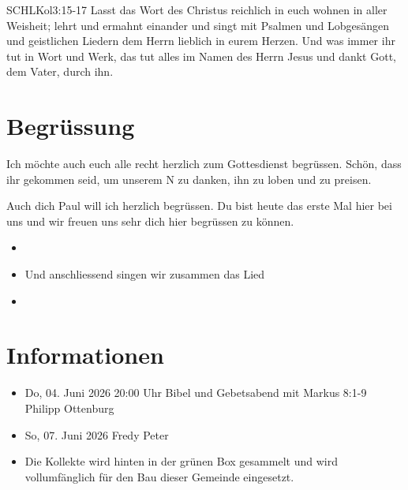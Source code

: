 \documentclass[fontsize=14pt]{../../inc/mybib}
\newcommand{\Name}{Paul}
\begin{document}
\begin{bibelbox}{SCHL}{Kol}{3:15-17}
    Lasst das Wort des Christus reichlich in euch wohnen in aller Weisheit; lehrt und ermahnt einander und singt mit Psalmen und Lobgesängen und geistlichen Liedern dem Herrn lieblich in eurem Herzen. Und was immer ihr tut in Wort und Werk, das tut alles im Namen des Herrn Jesus und dankt Gott, dem Vater, durch ihn.
\end{bibelbox}
\section{Begrüssung}
Ich möchte auch euch alle recht herzlich zum Gottesdienst begrüssen. Schön, dass ihr gekommen seid, um unserem \herr N zu danken, ihn zu loben und zu preisen.

Auch dich \Name{} will ich herzlich begrüssen. Du bist heute das erste Mal hier bei uns und wir freuen uns sehr dich hier begrüssen zu können.
\begin{itemize}
    \item[] 
    \item[] Und anschliessend singen wir zusammen das Lied
    \item[] 
\end{itemize}

\section{Informationen}
\begin{itemize}
    \item {} Do, 04. Juni 2026 20:00 Uhr Bibel und Gebetsabend mit Markus 8:1-9 Philipp Ottenburg
    \item {} So, 07. Juni 2026 Fredy Peter
    \item {} Die Kollekte wird hinten in der grünen Box gesammelt und wird vollumfänglich für den Bau dieser Gemeinde eingesetzt.
\end{itemize}
\end{document}
